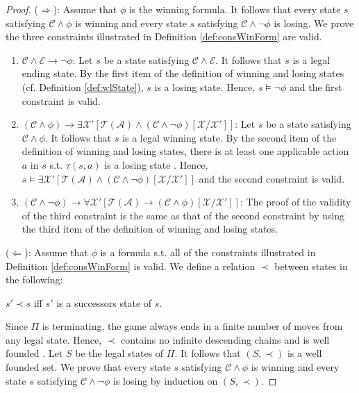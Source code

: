 \documentclass[review]{elsarticle}
\newcommand{\statevar}{\mathcal{X}}
\newcommand{\act}{\mathcal{A}}
\newcommand{\trans}{\mathcal{T}}
\newcommand{\constraint}{\mathcal{C}}
\newcommand{\estate}{\mathcal{E}}
\newcommand{\wfOrder}{\prec}
\begin{document}
	\begin{proof}
		($\Rightarrow$): Assume that $\phi$ is the winning formula.
		It follows that every state $s$ satisfying $\constraint \land \phi$ is winning and every state $s$ satisfying $\constraint \land \neg \phi$ is losing.	
		We prove the three constraints illustrated in Definition \ref{def:consWinForm} are valid.
		\begin{enumerate}
			\item $\constraint \land \estate \rightarrow \neg \phi$: 
			Let $s$ be a state satisfying $\constraint \land \estate$.
			It follows that $s$ is a legal ending state.
			By the first item of the definition of winning and losing states (cf. Definition \ref{def:wlState}), $s$ is a losing state.
			Hence, $s \models \neg \phi$ and the first constraint is valid.
				
			\item $(\constraint \land \phi) \rightarrow \exists \statevar' [\trans(\act) \land (\constraint \land \neg \phi)[\statevar/\statevar']]$: 
			Let $s$ be a state satisfying $\constraint \land \phi$.
			It follows that $s$ is a legal winning state.
			By the second item of the definition of winning and losing states, there is at least one applicable action $a$ in $s$ s.t. $\tau(s, a)$ is a losing state .
			Hence, $s \models \exists \statevar' [\trans(\act) \land (\constraint \land \neg \phi)[\statevar/\statevar']]$ and the second constraint is valid.
			
			\item $(\constraint \land \neg \phi) \rightarrow \forall \statevar' [\trans(\act) \rightarrow (\constraint \land \phi)[\statevar/\statevar']]$:
			The proof of the validity of the third constraint is the same as that of the second constraint by using the third item of the definition of winning and losing states.
		\end{enumerate}
				
		($\Leftarrow$): Assume that $\phi$ is a formula s.t. all of the constraints illustrated in Definition \ref{def:consWinForm} is valid.
		We define a relation $\wfOrder$ between states in the following:
		\begin{center}
			$s' \wfOrder s$ iff $s'$ is a successors state of $s$.
		\end{center}
		Since $\Pi$ is terminating, the game always ends in	a finite number of moves from any legal state.
		Hence, $\wfOrder$ contains no infinite descending chains and is well founded \cite{Levy1979}.
		Let $S$ be the legal states of $\Pi$.
		It follows that $(S, \wfOrder)$ is a well founded set.
		We prove that every state $s$ satisfying $\constraint \land \phi$ is winning and every state $s$ satisfying $\constraint \land \neg \phi$ is losing by induction on $(S, \wfOrder)$.
		

\end{proof}
\end{document}
